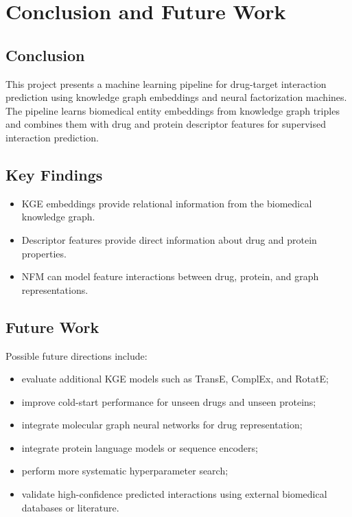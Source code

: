 \chapter{Conclusion and Future Work}
\label{chap:conclusion}

\section{Conclusion}

This project presents a machine learning pipeline for drug-target interaction
prediction using knowledge graph embeddings and neural factorization machines.
The pipeline learns biomedical entity embeddings from knowledge graph triples
and combines them with drug and protein descriptor features for supervised
interaction prediction.


\section{Key Findings}


\begin{itemize}
    \item KGE embeddings provide relational information from the biomedical
    knowledge graph.
    \item Descriptor features provide direct information about drug and protein
    properties.
    \item NFM can model feature interactions between drug, protein, and graph
    representations.
\end{itemize}

\section{Future Work}

Possible future directions include:

\begin{itemize}
    \item evaluate additional KGE models such as TransE, ComplEx, and RotatE;
    \item improve cold-start performance for unseen drugs and unseen proteins;
    \item integrate molecular graph neural networks for drug representation;
    \item integrate protein language models or sequence encoders;
    \item perform more systematic hyperparameter search;
    \item validate high-confidence predicted interactions using external
    biomedical databases or literature.
\end{itemize}
